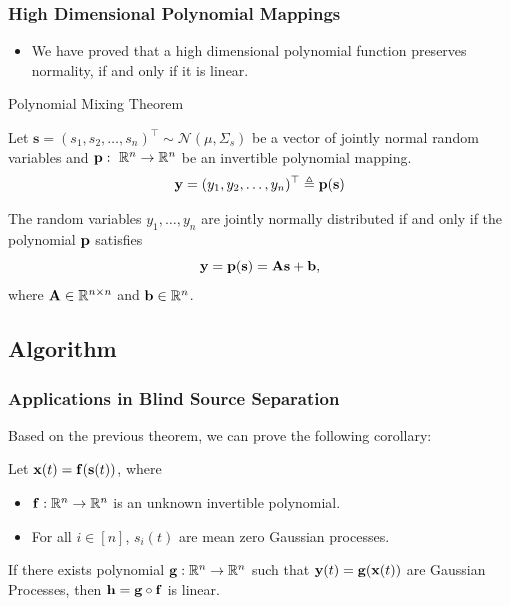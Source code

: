 \documentclass[usenames,dvipsnames]{beamer}
\begin{document}
\begin{frame}
\frametitle{High Dimensional Polynomial Mappings}
\begin{itemize}
\item We have proved that a high dimensional polynomial function preserves normality, if and only if it is linear.
\end{itemize}

\begin{alertblock}{Polynomial Mixing Theorem}
	\label{T_MainTheoremGPs}
	
	Let $\mathbf{s} = (s_1, s_2, \dots, s_n)^\top \sim \mathcal{N} (\mu, \Sigma_s)$ be a vector of jointly normal random variables and ${\bf p}:\ \mathbb{R}^{n} \rightarrow \mathbb{R}^{n}$ be an invertible polynomial mapping.
	\begin{equation}
	\label{E_LinearPolynomial}
	{\bf y} = (y_1, y_2, \dots, y_n)^\top \triangleq{\bf p}({\bf s})
	\end{equation}
		
	The random variables $y_1,\dots,y_n$ are jointly normally distributed if and only if the polynomial $\bf {p}$ satisfies
	\begin{equation}
	\label{E_LinearPolynomial1}
	{\bf y}={\bf p}({\bf s})={\bf A}{\bf s}+{\bf b},
	\end{equation}
	where ${\bf A} \in \mathbb{R}^{n\times n}$ and ${\bf b} \in \mathbb{R}^n$.
\end{alertblock}
\end{frame}


\subsection{Algorithm}
\begin{frame}
\frametitle{Applications in Blind Source Separation}
Based on the previous theorem, we can prove the following corollary:

\begin{corollary}
	Let ${\bf x}(t) = {\bf f} ({\bf s}(t))$, where 
	\begin{itemize}
	\item
	${\bf f} : \mathbb{R}^n \to \mathbb{R}^n$ is an unknown invertible polynomial.
	\item 
	For all $i \in [n]$, $s_i(t)$ are mean zero Gaussian processes.
	\end{itemize}
If there exists polynomial ${\bf g} : \mathbb{R}^n \to \mathbb{R}^n$ such that ${\bf y} (t) = {\bf g}({\bf x}(t))$ are Gaussian Processes, then ${\bf h} = {\bf g} \circ {\bf f}$ is linear.
\end{corollary}
\end{frame}
\end{document}
